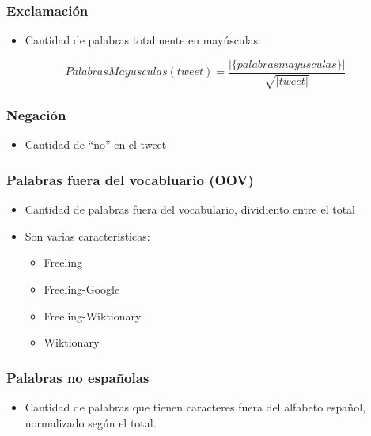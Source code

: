 \begin{frame}
    \frametitle{Exclamación}

    \begin{itemize}
        \item Cantidad de palabras totalmente en mayúsculas:
    \end{itemize}

    \begin{center}
        \[
            PalabrasMayusculas(tweet) = \frac{|\{palabras mayusculas\}|}{\sqrt{|tweet|}}
        \]
    \end{center}
\end{frame}

\begin{frame}
    \frametitle{Negación}

    \begin{itemize}
        \item Cantidad de ``no'' en el tweet
    \end{itemize}
\end{frame}

\begin{frame}
    \frametitle{Palabras fuera del vocabluario (OOV)}

    \begin{itemize}
        \item Cantidad de palabras fuera del vocabulario, dividiento entre el total
        \item Son varias características:
        \begin{itemize}
            \item Freeling
            \item Freeling-Google
            \item Freeling-Wiktionary
            \item Wiktionary
        \end{itemize}
    \end{itemize}
\end{frame}

\begin{frame}
    \frametitle{Palabras no españolas}

    \begin{itemize}
        \item Cantidad de palabras que tienen caracteres fuera del alfabeto español, normalizado según el total.
    \end{itemize}
\end{frame}

